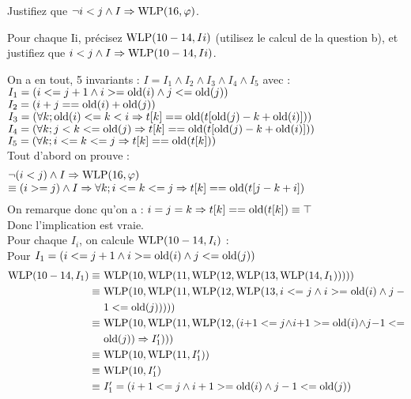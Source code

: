 \documentclass[11pt,answers]{exam}
\begin{document}
\begin{questions}
\begin{parts}
    Justifiez que $\neg i < j \land I \Rightarrow \mathrm{WLP}(16,\varphi)$.

    Pour chaque Ii, précisez $\mathrm{WLP}(10-14,Ii)$ (utilisez le calcul de la question b), et justifiez que $i < j \land I \Rightarrow \mathrm{WLP}(10-14,Ii)$.

    \begin{solutionorbox}
      On a en tout, 5 invariants : $I = I_1 \wedge I_2 \wedge I_3 \wedge I_4 \wedge I_5$ avec :\\
      $I_1 = (i <= j+1 \wedge i >= \mathrm{old}(i) \wedge j <= \mathrm{old}(j))$\\
      $I_2 = (i + j == \mathrm{old}(i) + \mathrm{old}(j))$\\
      $I_3 = (\forall k; \mathrm{old}(i) <= k < i \Rightarrow t[k] == \mathrm{old}(t[\mathrm{old}(j)-k+\mathrm{old}(i)]))$\\
      $I_4 = (\forall k; j < k <= \mathrm{old}(j) \Rightarrow t[k] == \mathrm{old}(t[\mathrm{old}(j)-k+\mathrm{old}(i)]))$\\
      $I_5 = (\forall k; i <= k <= j \Rightarrow t[k] == \mathrm{old}(t[k]))$\\
      Tout d'abord on prouve :
      $$\breaktowidth{12.7cm}{\neg(i<j) \wedge I \Rightarrow \WLP(16,\varphi)\\
      \equiv (i>=j) \wedge I \Rightarrow \forall k; i<=k<=j \Rightarrow t[k] == \old(t[j-k+i])}$$
      On remarque donc qu'on a : $i=j=k \Rightarrow t[k] == \mathrm{old}(t[k]) \equiv \top$\\
      Donc l'implication est vraie.\\
      Pour chaque $I_i$, on calcule $\mathrm{WLP}(10-14,I_i)$ : \\
      Pour $I_1 = (i <= j+1 \wedge i >= \mathrm{old}(i) \wedge j <= \mathrm{old}(j))$
      \begin{align*}
        \WLP(10-14,I_1) \equiv & ~\breaktowidth{10cm}{\WLP(10, \WLP(11, \WLP(12, \WLP(13, \WLP(14, I_1)))))}\\
        \equiv               & ~\breaktowidth{10cm}{\WLP(10, \WLP(11, \WLP(12, \WLP(13, i <= j \wedge i >= \old(i) \wedge j-1 <= \old(j)))))}\\
        \equiv               & ~\breaktowidth{10cm}{\WLP(10, \WLP(11, \WLP(12, (i+1 <= j \wedge i+1 >= \old(i) \wedge j-1 <= \old(j)) \Rightarrow I'_1)))}\\
        \equiv               & ~\breaktowidth{10cm}{\WLP(10, \WLP(11, I'_1))}\\
        \equiv               & ~\breaktowidth{10cm}{\WLP(10, I'_1)}\\
        \equiv               & ~\breaktowidth{10cm}{I'_1 = (i+1 <= j \wedge i+1 >= \old(i) \wedge j-1 <= \old(j))}

\end{align*}
\end{solutionorbox}
\end{parts}
\end{questions}
\end{document}

